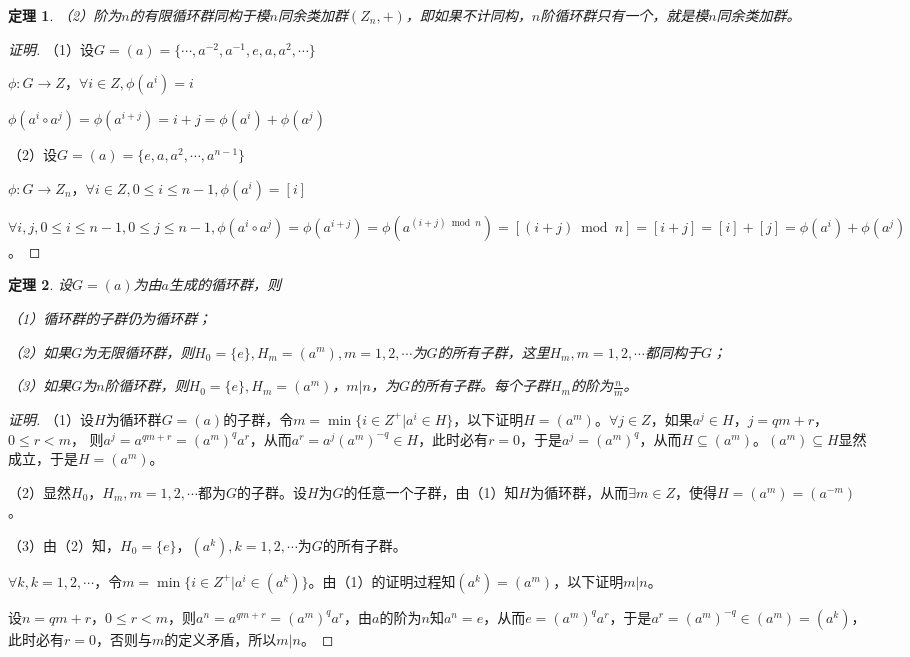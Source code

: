 \documentclass{article}
\newtheorem{Thm}{定理}
\begin{document}
\begin{CJK*}{UTF8}{gbsn}
\begin{Thm}
  （2）阶为$n$的有限循环群同构于模$n$同余类加群$(Z_n,+)$，即如果不计同构，$n$阶循环群只有一个，就是模$n$同余类加群。
\end{Thm}
\begin{proof}[证明]
  （1）设$G=(a)=\{\cdots,a^{-2},a^{-1},e,a,a^2,\cdots\}$

  $\phi:G\to Z$，$\forall i\in Z, \phi(a^i)=i$

  $\phi(a^i\circ a^j)=\phi(a^{i+j})=i+j=\phi(a^i)+\phi(a^j)$

  （2）设$G=(a)=\{e,a,a^2,\cdots,a^{n-1}\}$

  $\phi:G\to Z_n$，$\forall i\in Z, 0\leq i\leq n-1,\phi(a^i)=[i]$

  $\forall i,j, 0\leq i\leq n-1,0\leq j\leq n-1,\phi(a^i\circ a^j)=\phi(a^{i+j})=\phi(a^{(i+j)\bmod n})=[(i+j)\bmod n]=[i+j]=[i]+[j]=\phi(a^i)+ \phi(a^j)$。

\end{proof}
\begin{Thm}
  设$G=(a)$为由$a$生成的循环群，则

  （1）循环群的子群仍为循环群；

  （2）如果$G$为无限循环群，则$H_0=\{e\},H_m=(a^m),m=1,2,\cdots$为$G$的所有子群，这里$H_m,m=1,2,\cdots$都同构于$G$；

  （3）如果$G$为$n$阶循环群，则$H_0=\{e\},H_m=(a^m)$，$m|n$，为$G$的所有子群。每个子群$H_m$的阶为$\frac{n}{m}$。
\end{Thm}
\begin{proof}[证明]
  （1）设$H$为循环群$G=(a)$的子群，令$m=\min \{i\in Z^+|a^i\in H\}$，以下证明$H=(a^{m})$。$\forall j\in Z$，如果$a^j\in H$，$j=qm+r$，$0\leq r < m$，
  则$a^j=a^{qm+r}=(a^m)^qa^r$，从而$a^r=a^j(a^{m})^{-q}\in H$，此时必有$r=0$，于是$a^j=(a^m)^q$，从而$H\subseteq (a^m)$。$(a^m)\subseteq H$显然成立，于是$H=(a^m)$。

  （2）显然$H_0$，$H_m,m=1,2,\cdots$都为$G$的子群。设$H$为$G$的任意一个子群，由（1）知$H$为循环群，从而$\exists m\in Z$，使得$H=(a^m)=(a^{-m})$。

  （3）由（2）知，$H_0=\{e\}$，$(a^k),k=1,2,\cdots$为$G$的所有子群。

  $\forall k,k=1,2,\cdots$，令$m=\min \{i\in Z^+|a^i\in (a^k)\}$。由（1）的证明过程知$(a^k)=(a^m)$，以下证明$m|n$。

  设$n=qm+r$，$0\leq r < m$，则$a^n=a^{qm+r}=(a^m)^qa^r$，由$a$的阶为$n$知$a^n=e$，从而$e=(a^m)^qa^r$，于是$a^r=(a^m)^{-q}\in (a^m)=(a^k)$，此时必有$r=0$，否则与$m$的定义矛盾，所以$m|n$。


\end{proof}
\end{CJK*}
\end{document}

